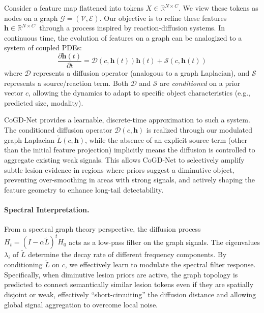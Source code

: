 \documentclass{article}
\begin{document}
Consider a feature map flattened into tokens $X \in \mathbb{R}^{N\times C}$. We view these tokens as nodes on a graph $\mathcal{G}=(\mathcal{V},\mathcal{E})$. Our objective is to refine these features $\mathbf{h} \in \mathbb{R}^{N \times C'}$ through a process inspired by reaction-diffusion systems. In continuous time, the evolution of features on a graph can be analogized to a system of coupled PDEs:
\begin{equation}
    \frac{\partial \mathbf{h}(t)}{\partial t} = \mathcal{D}(c, \mathbf{h}(t)) \mathbf{h}(t) + \mathcal{S}(c, \mathbf{h}(t))
    \label{eq:pde_analogy}
\end{equation}
where $\mathcal{D}$ represents a diffusion operator (analogous to a graph Laplacian), and $\mathcal{S}$ represents a source/reaction term. Both $\mathcal{D}$ and $\mathcal{S}$ are \emph{conditioned} on a prior vector $c$, allowing the dynamics to adapt to specific object characteristics (e.g., predicted size, modality).

CoGD-Net provides a learnable, discrete-time approximation to such a system. The conditioned diffusion operator $\mathcal{D}(c, \mathbf{h})$ is realized through our modulated graph Laplacian $\widetilde{L}(c, \mathbf{h})$, while the absence of an explicit source term (other than the initial feature projection) implicitly means the diffusion is controlled to aggregate existing weak signals. This allows CoGD-Net to selectively amplify subtle lesion evidence in regions where priors suggest a diminutive object, preventing over-smoothing in areas with strong signals, and actively shaping the feature geometry to enhance long-tail detectability.

\paragraph{Spectral Interpretation.}
From a spectral graph theory perspective, the diffusion process $H_{t} = (I - \alpha \widetilde{L})^t H_0$ acts as a low-pass filter on the graph signals. The eigenvalues $\lambda_i$ of $\widetilde{L}$ determine the decay rate of different frequency components. By conditioning $\widetilde{L}$ on $c$, we effectively learn to modulate the spectral filter response. Specifically, when diminutive lesion priors are active, the graph topology is predicted to connect semantically similar lesion tokens even if they are spatially disjoint or weak, effectively ``short-circuiting'' the diffusion distance and allowing global signal aggregation to overcome local noise. 
\end{document}
